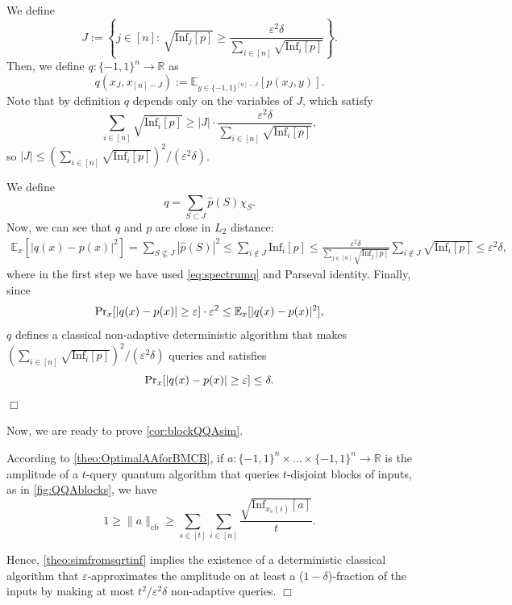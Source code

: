 \documentclass[11pt]{article}
\renewcommand{\Pr}{\mbox{\rm Pr}}
\newcommand{\E}{\mathbb{E}}
\DeclareMathOperator{\cb}{cb}
\newcommand{\norm}[1]{\|#1\|}
\newcommand{\R}{\mathbb{R}} %
\newcommand{\1}{\mathbf{1}}
\newcommand\Inf{\mathrm{Inf}}
\newcommand{\eps}{\varepsilon}
\theoremstyle{plain}
\theoremstyle{definition}
\theoremstyle{remark}
\renewenvironment{proof}[1][]{
    	\begin{trivlist}
     	\item[\hspace{\labelsep}{\em\noindent Proof#1:\/}]}
     	{{\hfill$\Box$}
    	\end{trivlist}
  }
\begin{document}
\theosimfromsqrtinf*

\begin{proof}
We define 
\begin{equation*}
    J:=\left\{j\in[n]:\,  \sqrt{\Inf_j[p]}\geq \frac{\eps^2\delta}{\sum_{i\in [n]}\sqrt{\Inf_i[p]}}\right\}. 
\end{equation*}
Then, we define $q:\{-1,1\}^n\to\R$ as 
\begin{equation*}
    q(x_J,x_{[n]-J}):=\mathbb E_{y\in\{-1,1\}^{[n]-J}}[p(x_J,y)].
\end{equation*}
Note that by definition $q$ depends only on the variables of $J$, which satisfy $$ \sum_{i\in [n]}\sqrt{\Inf_i[p]}\geq |J|\cdot \frac{\eps^2\delta}{\sum_{i\in [n]}\sqrt{\Inf_i[p]}},$$
so $|J|\leq (\sum_{i\in [n]}\sqrt{\Inf_i[p]})^2/(\eps^2\delta)$. 

We define \begin{equation}\label{eq:spectrumq}
    q=\sum_{S\subset J}\widehat p(S)\chi_S.
\end{equation}
Now, we can see that $q$ and $p$ are close in $L_2$ distance: 
\begin{align*}
    \mathbb E_x[|q(x)-p(x)|^2]=\sum_{S\not\subseteq J}|\widehat p(S)|^2\leq \sum_{i\not\in J}\Inf_i[p]\leq \frac{\eps^2\delta}{\sum_{j\in [n]}\sqrt{\Inf_j[p]}}\sum_{i\not\in J}\sqrt{\Inf_i[p]}\leq \eps^2\delta,
\end{align*}
where in the first step we have used \cref{eq:spectrumq} and Parseval identity. Finally, since 
\begin{equation*}
    \Pr_x[|q(x)-p(x)|\geq \eps]\cdot \eps^2\leq \E_x[|q(x)-p(x)|^2],
\end{equation*}$q$ defines a classical non-adaptive deterministic algorithm that makes $(\sum_{i\in [n]}\sqrt{\Inf_i[p]})^2/(\eps^2\delta)$ queries and satisfies $$ \Pr_x[|q(x)-p(x)|\geq \eps]\leq \delta.$$
\end{proof}

Now, we are ready to prove \cref{cor:blockQQAsim}. 

\begin{proof}[ of \cref{cor:blockQQAsim}]  According to \cref{theo:OptimalAAforBMCB}, if $a:\{-1,1\}^n\times\dots\times\{-1,1\}^n\to \R$ is the amplitude of a $t$-query quantum algorithm that queries $t$-disjoint blocks of inputs, as in \cref{fig:QQAblocks}, we have 
    \begin{equation*}
     1\geq \norm{a}_{\cb}\geq \sum_{s\in [t]}\sum_{i\in [n]}\frac{\sqrt{\Inf_{x_s(i)}[a]}}{t}.
\end{equation*}

Hence, \cref{theo:simfromsqrtinf} implies the existence of a deterministic classical algorithm that $\eps$-approximates the amplitude on at least a ($1-\delta$)-fraction of the inputs by making at most $t^2/\eps^2\delta$ non-adaptive queries.
\end{proof}
\end{document}
